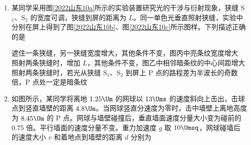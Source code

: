 \documentclass[\gkver]{gaokaozhenti}
\begin{document}
\begin{enumerate}
{$10 = 20\sin\varphi$

解得

$\varphi = \frac{\pi}{6}$

在 $t = 7 \Us$ 时刻

$y_{7} = 20\sin\left( \frac{2\pi}{12} \times 7 + \frac{\pi}{6} \right) = -10\sqrt{3} \Ucm \approx -17.3 \Ucm$

因

$7 \Us = \frac{1}{2}T + \frac{1}{12}T$

则在 $t = 7 \Us$ 时刻质点在 $y$ 轴负向向下振动，根据“同侧法”可判断若波向右传播，则波形为 C 所示；若波向左传播，则波形如 A 所示。

故选 AC。
}

\item
某同学采用图\ref{2022山东10a}所示的实验装置研究光的干涉与衍射现象，狭缝 S$_{1}$、S$_{2}$ 的宽度可调，狭缝到屏的距离为 $L$。同一单色光垂直照射狭缝，实验中分别在屏上得到了图\ref{2022山东10b}、图\ref{2022山东10c}所示图样。下列描述正确的是


{遮住一条狭缝，另一狭缝宽度增大，其他条件不变，图丙中亮条纹宽度增大}
{照射两条狭缝时，增加 $L$，其他条件不变，图乙中相邻暗条纹的中心间距增大}
{照射两条狭缝时，若光从狭缝 S$_{1}$、S$_{2}$ 到屏上 P 点的路程差为半波长的奇数倍，P 点处一定是暗条纹}


\item
如图所示，某同学将离地 $1.25 \Um$ 的网球以 $13 \Ums$ 的速度斜向上击出，击球点到竖直墙壁的距离 $4.8 \Um$。当网球竖直分速度为零时，击中墙壁上离地高度为 $8.45 \Um$ 的 P 点。网球与墙壁碰撞后，垂直墙面速度分量大小变为碰前的 0.75 倍。平行墙面的速度分量不变。重力加速度 $g$ 取 $10 \Umsq$，网球碰墙后的速度大小 $v$ 和着地点到墙壁的距离 $d$ 分别为


\end{enumerate}
\end{document}
